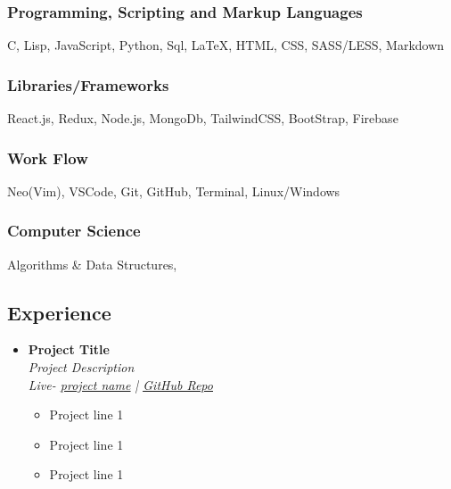 \documentclass[11pt, oneside, a4paper, titlepage]{article}
\begin{document}
\begin{tcolorbox}
\begin{minipage}[t]{8cm}
\begin{tcolorbox}[grow to left by=0.6cm,colback=gray!25,colframe=white]
        \subsubsection{Programming, Scripting and Markup Languages}
        C, Lisp, JavaScript, Python, Sql, {\LaTeX}, HTML, CSS, SASS/LESS, Markdown

        \subsubsection{Libraries/Frameworks}
        React.js, Redux, Node.js, MongoDb, TailwindCSS, BootStrap, Firebase

        \subsubsection{Work Flow}
        Neo(Vim), VSCode, Git, GitHub, Terminal, Linux/Windows

        \subsubsection{Computer Science}
        Algorithms \& Data Structures, 
    \end{tcolorbox}
  \end{minipage}
  \begin{minipage}[t]{11cm}
    \vspace*{-0.5cm}
    \begin{tcolorbox}[grow to right by=0.75cm,colframe=white,colback=white]
      \section*{Experience}
      \begin{itemize}
        \item
        {
          \textbf{Project Title} \\
          \textit{Project Description} \\
          \textit{Live-  \href{url}{\underline{project name}} | \href{https://github.com/SazedWorldbringer}{\underline{GitHub Repo}}} \\
          \vspace*{-0.7cm}
          \begin{itemize}
            \item Project line 1
            \item Project line 1
            \item Project line 1
          \end{itemize}
        }


\end{itemize}
\end{tcolorbox}
\end{minipage}
\end{tcolorbox}
\end{document}
